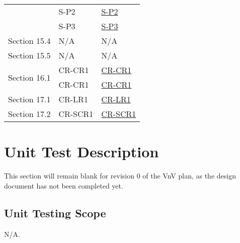 \documentclass[12pt, titlepage]{article}
\begin{document}
\begin{longtable}{|p{3cm}|p{4cm}|p{4cm}|}
  \cline{2-3}
  & S-P2 & \hyperref[S]{S-P2} \\
  \cline{2-3}
  & S-P3 & \hyperref[S]{S-P3} \\
  \hline
  \multirow{1}{3cm}{Section 15.4} 
  & N/A & N/A \\
  \hline
  \multirow{1}{3cm}{Section 15.5} 
  & N/A & N/A \\
  \hline
  \multirow{2}{3cm}{Section 16.1} 
  & CR-CR1 & \hyperref[CR]{CR-CR1} \\
  \cline{2-3}
  & CR-CR1 & \hyperref[CR]{CR-CR1} \\
  \hline
  \multirow{1}{3cm}{Section 17.1} 
  & CR-LR1 & \hyperref[CR]{CR-LR1} \\
  \hline
  \multirow{1}{3cm}{Section 17.2} 
  & CR-SCR1 & \hyperref[CR]{CR-SCR1} \\
  \hline
\end{longtable}

\newpage

\section{Unit Test Description}
\label{sec:unit_tests}
This section will remain blank for revision 0 of the VnV plan, as the design document has not been completed yet.




\subsection{Unit Testing Scope}
N/A.

\end{document}
